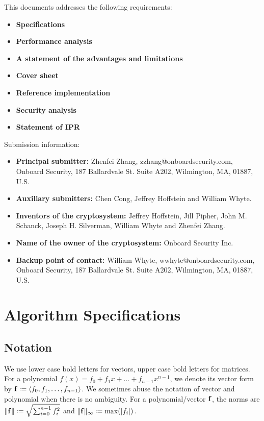 \documentclass{llncs}
\newcommand{\bff}{{\bf f}}
\newcommand{\<}{\langle}
\renewcommand{\>}{\rangle}
\newcommand*{\defeq}{\mathrel{\vcenter{\baselineskip0.5ex \lineskiplimit0pt
                     \hbox{\scriptsize.}\hbox{\scriptsize.}}}%
                     =}
\begin{document}
\noindent
This documents addresses the following  requirements:

\begin{itemize}
\item {\bf Specifications}
\item {\bf Performance analysis}
\item {\bf A statement of the advantages and limitations}
\item {\bf Cover sheet}
\item {\bf Reference implementation}
\item {\bf Security analysis}
\item {\bf Statement of IPR}
\end{itemize}

\noindent
Submission information:
\begin{itemize}
\item {\bf Principal submitter:} Zhenfei Zhang, zzhang@onboardsecurity.com, Onboard Security, 187 Ballardvale St. Suite A202, Wilmington, MA, 01887, U.S.
\item {\bf Auxiliary submitters:}
Chen Cong, Jeffrey Hoffstein and William Whyte.
\item {\bf 
Inventors of the cryptosystem:} Jeffrey Hoffstein,
               Jill Pipher,
               John M. Schanck,
               Joseph H. Silverman,
               William Whyte and
               Zhenfei Zhang.
\item {\bf Name of the owner of the cryptosystem:} 
Onboard Security Inc.      

\item {\bf Backup point of contact:} William Whyte, wwhyte@onboardsecurity.com, Onboard Security, 187 Ballardvale St. Suite A202, Wilmington, MA, 01887, U.S.
     
\end{itemize}


\section{Algorithm Specifications}
\subsection{Notation}

We use lower case bold letters for vectors, upper case bold letters for matrices.
For a polynomial $f(x) = f_0+f_1x+\dots+ f_{n-1}x^{n-1}$, 
we denote its vector form by $\bff \defeq \left<f_0, f_1, \dots, f_{n-1}\right>$.  We sometimes abuse the notation of vector and polynomial when there is no ambiguity.
For a polynomial/vector $\bff$, the norms are $\|\bff\| \defeq \sqrt{\sum_{i=0}^{n-1}f_i^2}$ and $\|\bff\|_\infty \defeq \max(|f_i|)$. 
\end{document}
